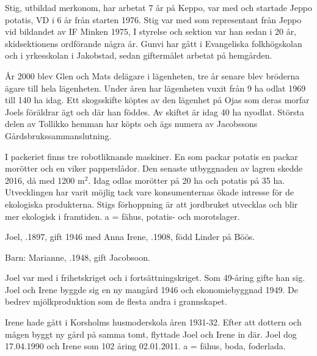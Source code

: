 Stig, utbildad merkonom, har arbetat 7 år på Keppo, var med och startade Jeppo potatis, VD i 6 år från starten 1976. Stig var med som representant från Jeppo vid bildandet av IF Minken 1975, I styrelse och sektion var han sedan i 20 år, skidsektionens ordförande några år. Gunvi har gått i Evangeliska folkhögskolan och i yrkesskolan i Jakobstad, sedan giftermålet arbetat på hemgården.

År 2000 blev Glen och Mats delägare i lägenheten, tre år senare blev bröderna ägare till hela lägenheten. Under åren har lägenheten vuxit från 9 ha odlat 1969 till 140 ha idag. Ett skogsskifte köptes av den lägenhet på Ojas som deras morfar Joels föräldrar ägt och där han föddes. Av skiftet är idag 40 ha nyodlat. Största delen av Tollikko hemman har köpts och ägs numera av Jacobssons Gårdsbrukssammanslutning.

I packeriet finns tre robotliknande maskiner. En som packar potatis en packar morötter och en viker papperslådor. Den senaste utbyggnaden av lagren skedde 2016, då med 1200 m$^2$. Idag odlas morötter på 20 ha och potatis på 35 ha. Utvecklingen har varit möjlig tack vare konsumenternas ökade intresse för de ekologiska produkterna. Stigs förhoppning är att jordbruket utvecklas och blir mer ekologisk i framtiden. a = fähus, potatis- och morotslager.





Joel, .1897, gift 1946 med Anna Irene, .1908, född Linder på Böös.

Barn:  Marianne, .1948, gift Jacobsoon.

Joel var med i frihetskriget och i fortsättningskriget. Som 49-åring gifte han sig. Joel och Irene byggde sig en ny mangård 1946 och ekonomiebyggnad 1949. De bedrev mjölkproduktion som de flesta andra i grannskapet.

Irene hade gått i Korsholms husmoderskola åren 1931-32. Efter att dottern och mågen byggt ny gård på samma tomt, flyttade Joel och Irene in där. Joel dog 17.04.1990 och Irene som 102 åring 02.01.2011. a = fähus, boda, foderlada.






